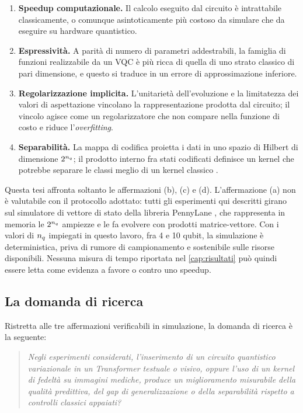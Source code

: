 \begin{enumerate}[label=(\alph*)]
  \item \textbf{Speedup computazionale.} Il calcolo eseguito dal circuito è
    intrattabile classicamente, o comunque asintoticamente più costoso da
    simulare che da eseguire su hardware quantistico.
  \item \textbf{Espressività.} A parità di numero di parametri addestrabili, la
    famiglia di funzioni realizzabile da un VQC è più ricca di quella di uno
    strato classico di pari dimensione, e questo si traduce in un errore di
    approssimazione inferiore.
  \item \textbf{Regolarizzazione implicita.} L'unitarietà dell'evoluzione e la
    limitatezza dei valori di aspettazione vincolano la rappresentazione prodotta
    dal circuito; il vincolo agisce come un regolarizzatore che non compare nella
    funzione di costo e riduce l'\emph{overfitting}.
  \item \textbf{Separabilità.} La mappa di codifica proietta i dati in uno spazio
    di Hilbert di dimensione $2^{n_q}$; il prodotto interno fra stati codificati
    definisce un kernel che potrebbe separare le classi meglio di un kernel
    classico \parencite{schuld2019quantum,havlicek2019supervised}.
\end{enumerate}

Questa tesi affronta soltanto le affermazioni (b), (c) e (d). L'affermazione (a)
non è valutabile con il protocollo adottato: tutti gli esperimenti
qui descritti girano sul simulatore di vettore di stato  della
libreria PennyLane \parencite{bergholm2018pennylane}, che rappresenta in memoria
le $2^{n_q}$ ampiezze e le fa evolvere con prodotti matrice-vettore. Con i valori
di $n_q$ impiegati in questo lavoro, fra 4 e 10 qubit, la simulazione è
deterministica, priva di rumore di campionamento e sostenibile sulle risorse
disponibili. Nessuna misura di tempo riportata nel
\cref{cap:risultati} può quindi essere letta come evidenza a favore o contro uno
speedup.

\subsection{La domanda di ricerca}
\label{ssec:domanda}

Ristretta alle tre affermazioni verificabili in simulazione, la domanda di ricerca
è la seguente:

\begin{quote}
\itshape
Negli esperimenti considerati, l'inserimento di un circuito quantistico
variazionale in un Transformer testuale o visivo, oppure l'uso di un kernel di
fedeltà su immagini mediche, produce un miglioramento misurabile della qualità
predittiva, del gap di generalizzazione o della separabilità rispetto a controlli
classici appaiati?
\end{quote}


